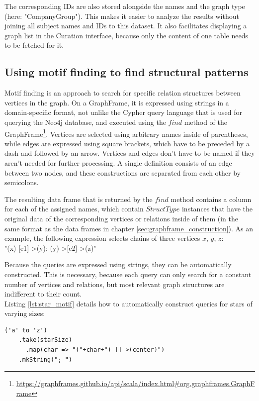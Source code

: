 \documentclass[
        a4paper,     %
        titlepage,   %
        oneside,     %
        parskip      %
]{scrartcl}          %
\begin{document}
  The corresponding IDs are also stored alongside the names and the graph type (here: "CompanyGroup"). This makes it easier to analyze
  the results without joining all subject names and IDs to this dataset. It also facilitates displaying
  a graph list in the Curation interface, because only the content of one table needs to be fetched for it.

  \subsection{Using motif finding to find structural patterns}
  \label{sec:motif_finding}
  Motif finding is an approach to search for specific relation structures between
  vertices in the graph. On a GraphFrame, it is expressed using strings in a
  domain-specific format, not unlike the Cypher query language that is used for
  querying the Neo4j database, and executed using the $find$ method of the
  GraphFrame\footnote{\url{https://graphframes.github.io/api/scala/index.html\#org.graphframes.GraphFrame}}.
  Vertices are selected using arbitrary names inside of parentheses, while edges are
  expressed using square brackets, which have to be preceded by a dash and followed by
  an arrow. Vertices and edges don't have to be named if they aren't needed for further processing.
  A single definition consists of an edge between two nodes, and these constructions are
  separated from each other by semicolons.

  The resulting data frame that is returned by the $find$ method contains a column
  for each of the assigned names, which contain $StructType$ instances that have the original
  data of the corresponding vertices or relations inside of them
  (in the same format as the data frames in chapter \ref{sec:graphframe_construction}).
  As an example, the following expression selects chains of three vertices $x$, $y$, $z$:\\
  {\small\ttfamily "(x)-[e1]->(y); (y)->[e2]->(z)"}

  Because the queries are expressed using strings, they can be automatically constructed.
  This is necessary, because each query can only search for a constant number of
  vertices and relations, but most relevant graph structures are indifferent
  to their count.\\
  Listing \ref{lst:star_motif} details how to automatically construct queries for
  stars of varying sizes:

  \begin{lstlisting}[style=scalaStyle,caption=Star Motif Query Creation,label=lst:star_motif]
  ('a' to 'z')
    .take(starSize)
	  .map(char => "("+char+")-[]->(center)")
    .mkString("; ")
  \end{lstlisting}
\end{document}
